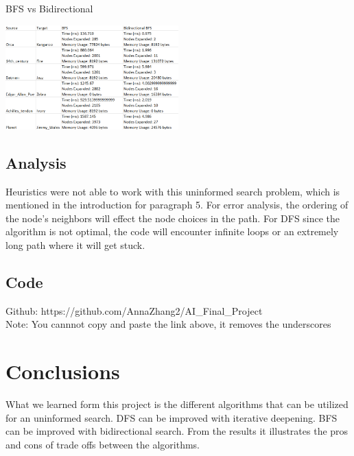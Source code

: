 \documentclass[letterpaper]{article} %
\begin{document}
BFS vs Bidirectional

\includegraphics[width=0.5\textwidth]{Images/BidirectionalBFS.png}



\subsection{Analysis}

Heuristics were not able to work with this uninformed search problem, which is mentioned in the introduction for paragraph 5. For error analysis, the ordering of the node's neighbors will effect the node choices in the path. For DFS since the algorithm is not optimal, the code will encounter infinite loops or an extremely long path where it will get stuck.

\subsection{Code}

Github: https://github.com/AnnaZhang2/AI\_Final\_Project\\
Note: You cannnot copy and paste the link above, it removes the underscores

\section{Conclusions}

What we learned form this project is the different algorithms that can be utilized for an uninformed search. DFS can be improved with iterative deepening. BFS can be improved with bidirectional search. From the results it illustrates the pros and cons of trade offs between the algorithms.
\end{document}
